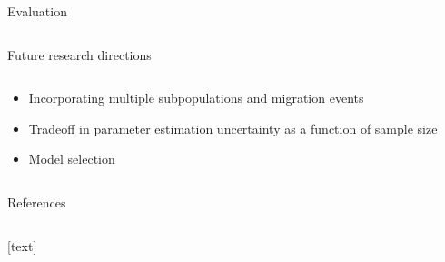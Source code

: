 \documentclass[final,hyperref={pdfpagelabels=false},professionalfonts,mathserif]{beamer}
\begin{document}
\begin{frame}[fragile]
\begin{columns}[t]
\begin{column}{.495\linewidth}
\begin{block}{\large Evaluation}
\begin{columns}[T]
\begin{column}{0.97\linewidth}

				
			\end{column}
        	\end{columns}
		\end{block}
		
		\begin{block}{\large Future research directions} \justifying 
			\begin{columns}[T] 
			\begin{column}{.97\linewidth}
			\vspace{-0.7cm}
			\begin{itemize}
				\item Incorporating multiple subpopulations and migration events
				\item Tradeoff in parameter estimation uncertainty as a function of sample size
				\item Model selection
			\end{itemize}
	    	\end{column} 
			\end{columns}
			\vspace{-0.4cm}
		\end{block} 
		
		\begin{block}{\large References} 
			\begin{columns}[T] 
			\begin{column}{.97\linewidth}
			\vspace{-0.8cm}
			[text]
			
			\scriptsize{}
            \vspace{-0.5cm}
			\end{column}
			\end{columns}
		\end{block}
      
	\end{column}
\end{columns}


\end{frame}
\end{document}
